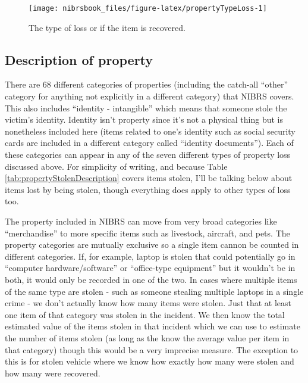 \documentclass[
  12pt,
  openany]{book}
\begin{document}
\begin{figure}

{\centering \texttt{[image: nibrsbook\_files/figure-latex/propertyTypeLoss-1]} 

}

\caption{The type of loss or if the item is recovered.}\label{fig:propertyTypeLoss}
\end{figure}

\hypertarget{description-of-property}{%
\subsection{Description of property}\label{description-of-property}}

There are 68 different categories of properties (including the catch-all ``other'' category for anything not explicitly in a different category) that NIBRS covers. This also includes ``identity - intangible'' which means that someone stole the victim's identity. Identity isn't property since it's not a physical thing but is nonetheless included here (items related to one's identity such as social security cards are included in a different category called ``identity documents''). Each of these categories can appear in any of the seven different types of property loss discussed above. For simplicity of writing, and because Table \ref{tab:propertyStolenDescription} covers items stolen, I'll be talking below about items lost by being stolen, though everything does apply to other types of loss too.

The property included in NIBRS can move from very broad categories like ``merchandise'' to more specific items such as livestock, aircraft, and pets. The property categories are mutually exclusive so a single item cannon be counted in different categories. If, for example, laptop is stolen that could potentially go in ``computer hardware/software'' or ``office-type equipment'' but it wouldn't be in both, it would only be recorded in one of the two. In cases where multiple items of the same type are stolen - such as someone stealing multiple laptops in a single crime - we don't actually know how many items were stolen. Just that at least one item of that category was stolen in the incident. We then know the total estimated value of the items stolen in that incident which we can use to estimate the number of items stolen (as long as the know the average value per item in that category) though this would be a very imprecise measure. The exception to this is for stolen vehicle where we know how exactly how many were stolen and how many were recovered.
\end{document}
